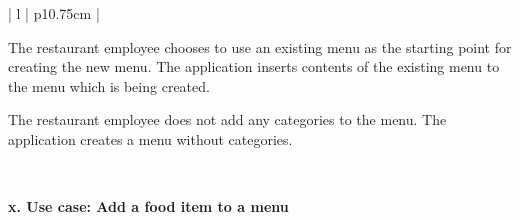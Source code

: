 \begin{center}
\begin{tabular}{| l | p{10.75cm} | }
\begin{minipage}[t]{\linewidth}
\begin{description}[nosep,after=\strut]
        \item [A1:] The restaurant employee chooses to use an existing menu as the starting point for creating the new menu. The application inserts contents of the existing menu to the menu which is being created.
        \item [A2:] The restaurant employee does not add any categories to the menu. The application creates a menu without categories.
      \end{description}
    \end{minipage}
    \\
    \hline
  \end{tabular}
  \newline
\end{center}

\newpage

\noindent \textbf{x. Use case: Add a food item to a menu} 
